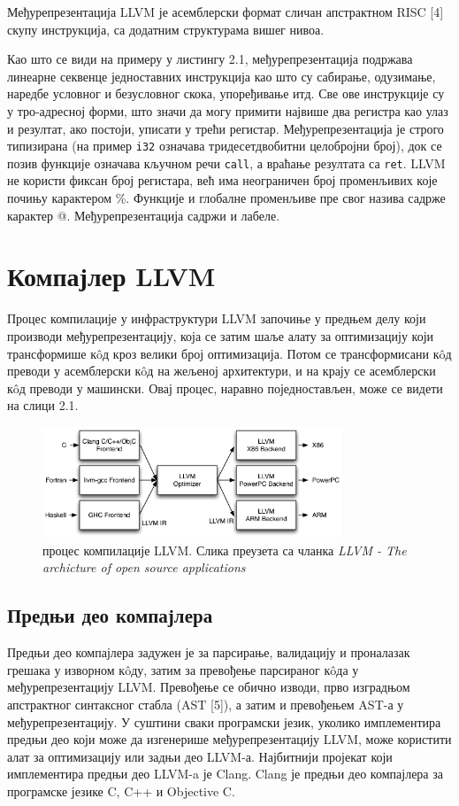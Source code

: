 \documentclass[12pt,oneside]{memoir}
\begin{document}
Међурепрезентација LLVM је асемблерски формат сличан апстрактном RISC [4] скупу
инструкција, са додатним структурама вишег нивоа.

Као што се види на примеру у листингу 2.1, међурепрезентација подржава линеарне секвенце
једноставних инструкција као што су сабирање, одузимање, наредбе условног и безусловног
 скока, упоређивање итд.
Све ове инструкције су у тро-адресној форми, што значи да могу примити највише два регистра 
као улаз и резултат, ако постоји, уписати у трећи регистар.
Међурепрезентација је строго типизирана (на пример \texttt{i32} означава тридесетдвобитни
целобројни број), док се позив функције означава кључном речи \texttt{call}, а враћање
резултата са \texttt{ret}.
LLVM не користи фиксан број регистара, већ има неограничен број променљивих које
почињу карактером \%. 
Функције и глобалне променљиве пре свог назива садрже карактер @.
Међурепрезентација садржи и лабеле.

\section{Компајлер LLVM}  

Процес компилације у инфраструктури LLVM започиње у предњем  делу који производи
међурепрезентацију, која се затим шаље алату за оптимизацију који трансформише
к\^{o}д кроз велики број оптимизација.
Потом се трансформисани к\^{o}д преводи у асемблерски к\^{o}д на жељеној архитектури, 
и на крају се асемблерски к\^{o}д преводи у машински. 
Овај процес, наравно поједностављен, може се видети на слици 2.1. 

\begin{figure}[!ht]
  \centering
  \includegraphics[width=0.8\textwidth]{LLVMCompiler1.png}
  \caption{процес компилације LLVM. Слика преузета са чланка \textit{LLVM - The archicture of open source applications}  }
  \label{fig:grafikon}
\end{figure}

\subsection{Предњи део компајлера}
 Предњи део компајлера задужен је за парсирање, валидацију и проналазак грешака у изворном
 к\^{o}ду, затим за превођење парсираног к\^{o}да у међурепрезентацију LLVM.
 Превођење се обично изводи, прво изградњом апстрактног синтаксног стабла (AST [5]), а затим  и превођењем AST-а у међурепрезентацију.
 У суштини сваки програмски језик, уколико имплементира предњи део који може да
 изгенерише међурепрезентацију LLVM, може користити алат за оптимизацију или 
 задњи део LLVM-а.
 Најбитнији пројекат који имплементира предњи део LLVM-a је Clang.
 Clang је предњи део компајлера за програмске језике  C, C++ и Objective C.
\end{document}
